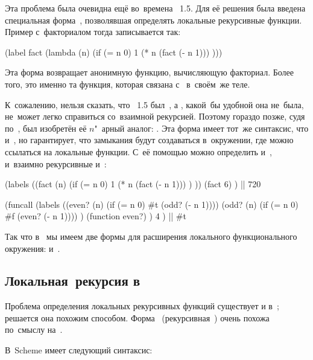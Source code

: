 Эта проблема была очевидна ещё во~времена \LISP~1.5. Для её решения была введена
специальная форма~, позволявшая определять локальные рекурсивные
функции. Пример с~факториалом тогда записывается так:

\begin{code:lisp}
(label fact (lambda (n) (if (= n 0) 1
                            (* n (fact (- n 1))) )))
\end{code:lisp}

Эта форма возвращает анонимную функцию, вычисляющую факториал. Более того, это
именно та функция, которая связана с~ в~своём~же теле.

К~сожалению, нельзя сказать, что \LISP~1.5 был~, а , какой~бы
удобной она не~была, не~может легко справиться со~взаимной рекурсией. Поэтому
гораздо позже, судя по~\cite{hs75}, был изобретён её $n$"~арный аналог:
. Эта форма имеет тот~же синтаксис, что и~, но гарантирует,
что замыкания будут создаваться в~окружении, где можно ссылаться на локальные
функции. С~её помощью можно определить и~, и~взаимно рекурсивные
 и~:

\begin{code:lisp}
(labels ((fact (n) (if (= n 0) 1
                       (* n (fact (- n 1))) ) ))
  (fact 6) ) |\is| 720

(funcall (labels ((even? (n) (if (= n 0) #t (odd? (- n 1))))
                  (odd? (n) (if (= n 0) #f (even? (- n 1)))) )
           (function even?) )
         4 ) |\is| #t
\end{code:lisp}

Так что в~ мы имеем две формы для расширения локального функционального
окружения:  и~.


\subsection{\texorpdfstring{Локальная~рекурсия в~}%
{Локальная рекурсия в Lisp₁}}%
\label{lisp1-2-omega/recusion/ssect:local-lisp1}

Проблема определения локальных рекурсивных функций существует и в~;
решается она похожим способом. Форма~ (рекурсивная~) очень
похожа по~смыслу на~.

В~Scheme  имеет следующий синтаксис:

